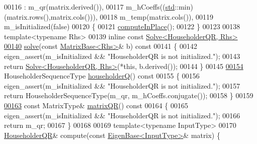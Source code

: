 \begin{DoxyCode}
00116       : m\_qr(matrix.derived()),
00117         m\_hCoeffs((\hyperlink{namespacestd}{std}::min)(matrix.rows(),matrix.cols())),
00118         m\_temp(matrix.cols()),
00119         m\_isInitialized(false)
00120     \{
00121       \hyperlink{group___q_r___module_a3a16530338a734971fc45efb0ef9ac94}{computeInPlace}();
00122     \}
00123 
00138     \textcolor{keyword}{template}<\textcolor{keyword}{typename} Rhs>
00139     \textcolor{keyword}{inline} \textcolor{keyword}{const} \hyperlink{group___core___module_class_eigen_1_1_solve}{Solve<HouseholderQR, Rhs>}
\hyperlink{group___q_r___module_a3e8e56769bbaaed0616ad98c4ff99c7b}{00140}     \hyperlink{group___q_r___module_a3e8e56769bbaaed0616ad98c4ff99c7b}{solve}(\textcolor{keyword}{const} \hyperlink{group___core___module_class_eigen_1_1_matrix_base}{MatrixBase<Rhs>}& b)\textcolor{keyword}{ const}
00141 \textcolor{keyword}{    }\{
00142       eigen\_assert(m\_isInitialized && \textcolor{stringliteral}{"HouseholderQR is not initialized."});
00143       \textcolor{keywordflow}{return} \hyperlink{group___core___module_class_eigen_1_1_solve}{Solve<HouseholderQR, Rhs>}(*\textcolor{keyword}{this}, b.derived());
00144     \}
00145 
\hyperlink{group___q_r___module_affd506c10ef2d25f56e7b1f9f25ff885}{00154}     HouseholderSequenceType \hyperlink{group___q_r___module_affd506c10ef2d25f56e7b1f9f25ff885}{householderQ}()\textcolor{keyword}{ const}
00155 \textcolor{keyword}{    }\{
00156       eigen\_assert(m\_isInitialized && \textcolor{stringliteral}{"HouseholderQR is not initialized."});
00157       \textcolor{keywordflow}{return} HouseholderSequenceType(m\_qr, m\_hCoeffs.conjugate());
00158     \}
00159 
\hyperlink{group___q_r___module_ae837f2fb30099212c53b3042c7d699c9}{00163}     \textcolor{keyword}{const} MatrixType& \hyperlink{group___q_r___module_ae837f2fb30099212c53b3042c7d699c9}{matrixQR}()\textcolor{keyword}{ const}
00164 \textcolor{keyword}{    }\{
00165         eigen\_assert(m\_isInitialized && \textcolor{stringliteral}{"HouseholderQR is not initialized."});
00166         \textcolor{keywordflow}{return} m\_qr;
00167     \}
00168 
00169     \textcolor{keyword}{template}<\textcolor{keyword}{typename} InputType>
00170     \hyperlink{group___q_r___module_class_eigen_1_1_householder_q_r}{HouseholderQR}& compute(\textcolor{keyword}{const} \hyperlink{group___core___module_struct_eigen_1_1_eigen_base}{EigenBase<InputType>}& matrix) \{

\end{DoxyCode}
